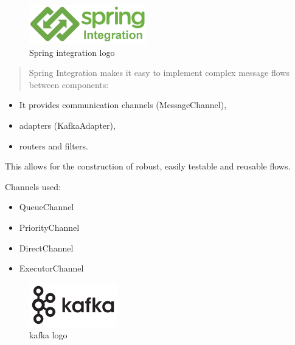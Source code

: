 \documentclass[12pt,a4paper]{report}
\begin{document}
\begin{figure}[H]
\centering
\includegraphics[width=2in]{media/image84.png}
\caption{Spring integration
logo}
\label{fig:SIL}
\end{figure} 


\begin{quote}
Spring Integration makes it easy to implement complex message flows
between components:
\end{quote}

\begin{itemize}
\item It provides communication channels (MessageChannel),
\item adapters (KafkaAdapter),
\item routers and filters.
\end{itemize}

This allows for the construction of robust, easily testable and reusable
flows.

Channels used:

\begin{itemize}
\item QueueChannel
\item PriorityChannel
\item DirectChannel
\item ExecutorChannel
\end{itemize}
\clearpage

\begin{figure}[H]
\centering
\includegraphics[width=1.5in]{media/image85.png}
\caption{kafka logo}
\label{fig:SIL}
\end{figure} 
\end{document}
